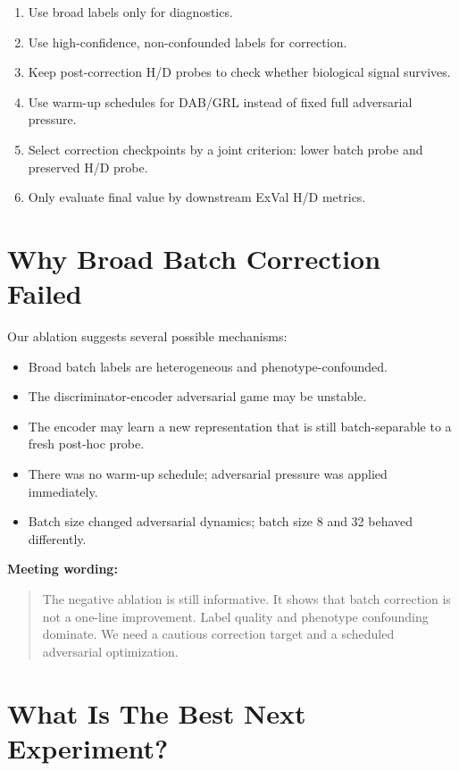 \documentclass[11pt]{article}
\begin{document}
\begin{enumerate}
  \item Use broad labels only for diagnostics.
  \item Use high-confidence, non-confounded labels for correction.
  \item Keep post-correction H/D probes to check whether biological signal survives.
  \item Use warm-up schedules for DAB/GRL instead of fixed full adversarial pressure.
  \item Select correction checkpoints by a joint criterion: lower batch probe and
  preserved H/D probe.
  \item Only evaluate final value by downstream ExVal H/D metrics.
\end{enumerate}

\section{Why Broad Batch Correction Failed}

Our ablation suggests several possible mechanisms:

\begin{itemize}
  \item Broad batch labels are heterogeneous and phenotype-confounded.
  \item The discriminator-encoder adversarial game may be unstable.
  \item The encoder may learn a new representation that is still batch-separable to a fresh
  post-hoc probe.
  \item There was no warm-up schedule; adversarial pressure was applied immediately.
  \item Batch size changed adversarial dynamics; batch size 8 and 32 behaved differently.
\end{itemize}

\textbf{Meeting wording:}

\begin{quote}
The negative ablation is still informative. It shows that batch correction is not a
one-line improvement. Label quality and phenotype confounding dominate. We need a cautious
correction target and a scheduled adversarial optimization.
\end{quote}

\section{What Is The Best Next Experiment?}
\end{document}
